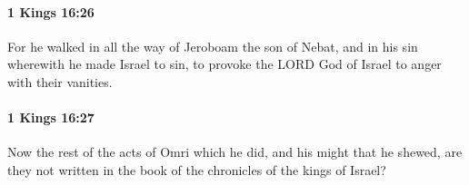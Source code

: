 		\paragraph{1 Kings 16:26} %
			\label{1KINGS-16-26}

			For he walked in all the way of Jeroboam the son of Nebat, and in his sin wherewith he made Israel to sin, to provoke the LORD God of Israel to anger with their vanities.


		\paragraph{1 Kings 16:27} %
			\label{1KINGS-16-27}

			Now the rest of the acts of Omri which he did, and his might that he shewed, are they not written in the book of the chronicles of the kings of Israel?


